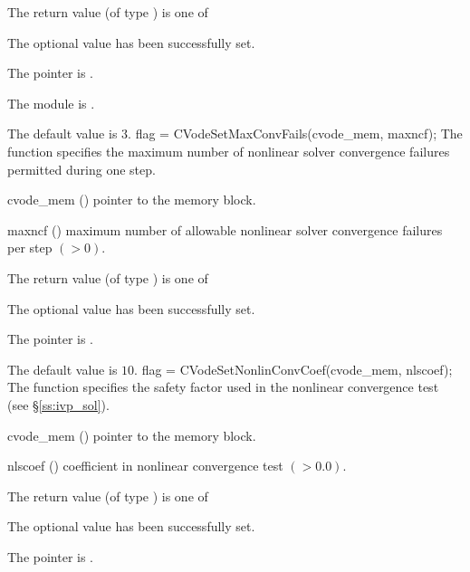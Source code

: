 {
  The return value  (of type ) is one of
  \begin{args}
  \item[\Id{CV\_SUCCESS}]
    The optional value has been successfully set.
  \item[\Id{CV\_MEM\_NULL}]
    The  pointer is .
  \item[\Id{CV\_MEM\_FAIL}]
    The {\sunnonlinsol} module is .
  \end{args}
}
{
  The default value is $3$.
}
{
flag = CVodeSetMaxConvFails(cvode\_mem, maxncf);
}
{
  The function  specifies the
  maximum number of nonlinear solver convergence failures permitted during
  one step.
}
{
  \begin{args}
  \item[cvode\_mem] ()
    pointer to the {\cvode} memory block.
  \item[maxncf] ()
    maximum number of allowable nonlinear solver convergence failures
    per step $( > 0)$.
  \end{args}
}
{
  The return value  (of type ) is one of
  \begin{args}
  \item[\Id{CV\_SUCCESS}]
    The optional value has been successfully set.
  \item[\Id{CV\_MEM\_NULL}]
    The  pointer is .
  \end{args}
}
{
  The default value is $10$.
}
{
flag = CVodeSetNonlinConvCoef(cvode\_mem, nlscoef);
}
{
  The function  specifies the safety factor used
  in the nonlinear convergence test (see \S\ref{ss:ivp_sol}).
}
{
  \begin{args}
  \item[cvode\_mem] ()
    pointer to the {\cvode} memory block.
  \item[nlscoef] ()
    coefficient in nonlinear convergence test $( > 0.0)$.
  \end{args}
}
{
  The return value  (of type ) is one of
  \begin{args}
  \item[\Id{CV\_SUCCESS}]
    The optional value has been successfully set.
  \item[\Id{CV\_MEM\_NULL}]
    The  pointer is .
  \end{args}
}
